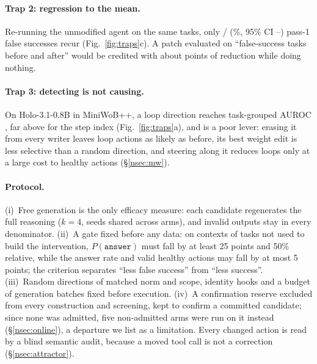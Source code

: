 \paragraph{Trap 2: regression to the mean.} Re-running the unmodified agent on the same tasks, only \rtmFsAgain/\rtmFsN{} (\rtmFsAgainPct\%, 95\% CI \rtmFsAgainLo--\rtmFsAgainHi) pass-1 false successes recur (Fig.~\ref{fig:traps}c). A patch evaluated on ``false-success tasks before and after'' would be credited with about \rtmFakeEffect{} points of reduction while doing nothing.

\paragraph{Trap 3: detecting is not causing.} On Holo-3.1-0.8B in MiniWoB++, a loop direction reaches task-grouped AUROC \mwAucBestExact, far above \mwAucStep{} for the step index (Fig.~\ref{fig:traps}a), and is a poor lever: erasing it from every writer leaves loop actions as likely as before, its best weight edit is less selective than a random direction, and steering along it reduces loops only at a large cost to healthy actions (\S\ref{nsec:mw}).


\paragraph{Protocol.} (i)~Free generation is the only efficacy measure: each candidate regenerates the full reasoning ($k=4$, seeds shared across arms), and invalid outputs stay in every denominator. (ii)~A gate fixed before any data: on \fsp{} contexts of tasks not used to build the intervention, $P(\texttt{answer})$ must fall by at least 25 points and 50\% relative, while the \fsm{} answer rate and valid healthy actions may fall by at most 5 points; the \fsm{} criterion separates ``less false success'' from ``less success''. (iii)~Random directions of matched norm and scope, identity hooks and a budget of generation batches fixed before execution. (iv)~A confirmation reserve excluded from every construction and screening, kept to confirm a committed candidate; since none was admitted, five non-admitted arms were run on it instead (\S\ref{nsec:online}), a departure we list as a limitation. Every changed action is read by a blind semantic audit, because a moved tool call is not a correction (\S\ref{nsec:attractor}). %

